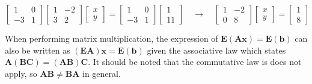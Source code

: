         \begin{equation}
            \begin{bmatrix}
                1 & 0 \\
                -3 & 1
            \end{bmatrix}
            \begin{bmatrix}
                1 & -2 \\
                3 & 2
            \end{bmatrix}
            \begin{bmatrix}
                x \\
                y
            \end{bmatrix}
            =
            \begin{bmatrix}
                1 & 0 \\
                -3 & 1
            \end{bmatrix}
            \begin{bmatrix}
                1 \\
                11
            \end{bmatrix}
            \quad \rightarrow \quad
            \begin{bmatrix}
                1 & -2 \\
                0 & 8
            \end{bmatrix}
            \begin{bmatrix}
                x \\
                y
            \end{bmatrix}
            =
            \begin{bmatrix}
                1 \\
                8
            \end{bmatrix}
        \end{equation}
        \par \hfill \break
        When performing matrix multiplication, the expression of 
        \(\boldsymbol{E}(\boldsymbol{Ax}) = \boldsymbol{E}(\boldsymbol{b})\) can also be written as 
        \((\boldsymbol{EA})\boldsymbol{x} = \boldsymbol{E}(\boldsymbol{b})\) given the associative law which states
        \(\boldsymbol{A}(\boldsymbol{BC})=(\boldsymbol{AB})\boldsymbol{C}\). It should be noted that the commutative 
        law is does not apply, so \(\boldsymbol{AB} \neq \boldsymbol{BA}\) in general.

